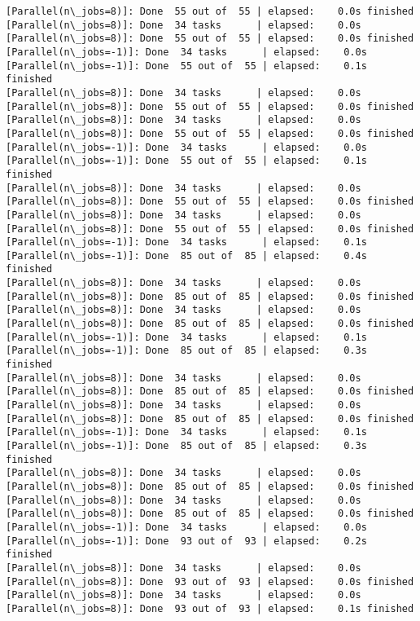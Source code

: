 \documentclass[11pt]{article}
\begin{document}
\begin{Verbatim}[commandchars=\\\{\}]
[Parallel(n\_jobs=8)]: Done  55 out of  55 | elapsed:    0.0s finished
[Parallel(n\_jobs=8)]: Done  34 tasks      | elapsed:    0.0s
[Parallel(n\_jobs=8)]: Done  55 out of  55 | elapsed:    0.0s finished
[Parallel(n\_jobs=-1)]: Done  34 tasks      | elapsed:    0.0s
[Parallel(n\_jobs=-1)]: Done  55 out of  55 | elapsed:    0.1s finished
[Parallel(n\_jobs=8)]: Done  34 tasks      | elapsed:    0.0s
[Parallel(n\_jobs=8)]: Done  55 out of  55 | elapsed:    0.0s finished
[Parallel(n\_jobs=8)]: Done  34 tasks      | elapsed:    0.0s
[Parallel(n\_jobs=8)]: Done  55 out of  55 | elapsed:    0.0s finished
[Parallel(n\_jobs=-1)]: Done  34 tasks      | elapsed:    0.0s
[Parallel(n\_jobs=-1)]: Done  55 out of  55 | elapsed:    0.1s finished
[Parallel(n\_jobs=8)]: Done  34 tasks      | elapsed:    0.0s
[Parallel(n\_jobs=8)]: Done  55 out of  55 | elapsed:    0.0s finished
[Parallel(n\_jobs=8)]: Done  34 tasks      | elapsed:    0.0s
[Parallel(n\_jobs=8)]: Done  55 out of  55 | elapsed:    0.0s finished
[Parallel(n\_jobs=-1)]: Done  34 tasks      | elapsed:    0.1s
[Parallel(n\_jobs=-1)]: Done  85 out of  85 | elapsed:    0.4s finished
[Parallel(n\_jobs=8)]: Done  34 tasks      | elapsed:    0.0s
[Parallel(n\_jobs=8)]: Done  85 out of  85 | elapsed:    0.0s finished
[Parallel(n\_jobs=8)]: Done  34 tasks      | elapsed:    0.0s
[Parallel(n\_jobs=8)]: Done  85 out of  85 | elapsed:    0.0s finished
[Parallel(n\_jobs=-1)]: Done  34 tasks      | elapsed:    0.1s
[Parallel(n\_jobs=-1)]: Done  85 out of  85 | elapsed:    0.3s finished
[Parallel(n\_jobs=8)]: Done  34 tasks      | elapsed:    0.0s
[Parallel(n\_jobs=8)]: Done  85 out of  85 | elapsed:    0.0s finished
[Parallel(n\_jobs=8)]: Done  34 tasks      | elapsed:    0.0s
[Parallel(n\_jobs=8)]: Done  85 out of  85 | elapsed:    0.0s finished
[Parallel(n\_jobs=-1)]: Done  34 tasks      | elapsed:    0.1s
[Parallel(n\_jobs=-1)]: Done  85 out of  85 | elapsed:    0.3s finished
[Parallel(n\_jobs=8)]: Done  34 tasks      | elapsed:    0.0s
[Parallel(n\_jobs=8)]: Done  85 out of  85 | elapsed:    0.0s finished
[Parallel(n\_jobs=8)]: Done  34 tasks      | elapsed:    0.0s
[Parallel(n\_jobs=8)]: Done  85 out of  85 | elapsed:    0.0s finished
[Parallel(n\_jobs=-1)]: Done  34 tasks      | elapsed:    0.0s
[Parallel(n\_jobs=-1)]: Done  93 out of  93 | elapsed:    0.2s finished
[Parallel(n\_jobs=8)]: Done  34 tasks      | elapsed:    0.0s
[Parallel(n\_jobs=8)]: Done  93 out of  93 | elapsed:    0.0s finished
[Parallel(n\_jobs=8)]: Done  34 tasks      | elapsed:    0.0s
[Parallel(n\_jobs=8)]: Done  93 out of  93 | elapsed:    0.1s finished

\end{Verbatim}
\end{document}
